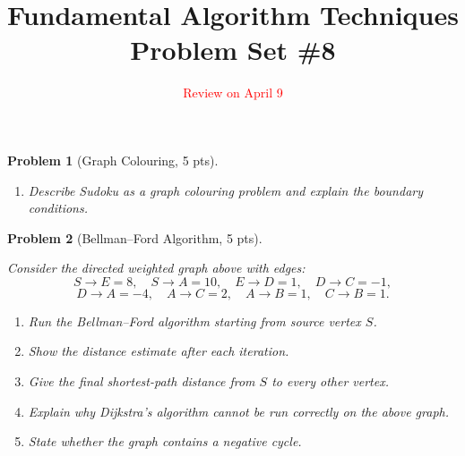 \documentclass[11pt]{article}
\title{\textbf{Fundamental Algorithm Techniques} \\ Problem Set \#8}
\date{\textcolor{red}{Review on April 9}}
\newtheorem{problem}{Problem}
\begin{document}
\maketitle

\begin{problem}[Graph Colouring, 5 pts]

\begin{enumerate}
    \item Describe Sudoku as a graph colouring problem and explain the boundary conditions.
\end{enumerate}

\end{problem}

\begin{problem}[Bellman--Ford Algorithm, 5 pts]

\begin{center}
\end{center}




Consider the directed weighted graph above with edges:
\[
S \to E = 8,\quad
S \to A = 10,\quad
E \to D = 1,\quad
D \to C = -1,
\]
\[
D \to A = -4,\quad
A \to C = 2,\quad
A \to B = 1,\quad
C \to B = 1.
\]

\begin{enumerate}
    \item Run the Bellman--Ford algorithm starting from source vertex $S$.
    \item Show the distance estimate after each iteration.
    \item Give the final shortest-path distance from $S$ to every other vertex.
    \item Explain why Dijkstra's algorithm cannot be run correctly on the above graph.
    \item State whether the graph contains a negative cycle.
\end{enumerate}

\end{problem}
\end{document}
